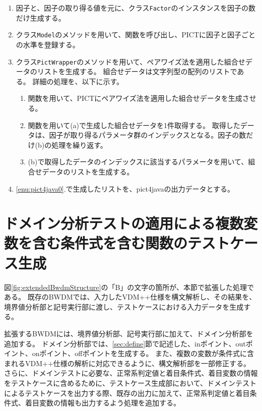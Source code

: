 \documentclass[uplatex, report, a4j, 10pt]{jsbook}
\newcommand\ttt[1]{\texttt{#1}}
\begin{document}
\begin{enumerate}
  \item 因子と、因子の取り得る値を元に、クラス\ttt{Factor}のインスタンスを因子の数だけ生成する。
  \item クラス\ttt{Model}の\addFactor{}メソッドを用いて、\PictAddParameter{}関数を呼び出し、PICTに因子と因子ごとの水準を登録する。
  \item\label{enu:pict4java0} クラス\ttt{PictWrapper}の\generate{}メソッドを用いて、ペアワイズ法を適用した組合せデータのリストを生成する。
        組合せデータは文字列型の配列のリストである。
        詳細の処理を、以下に示す。
        \begin{enumerate}
          \item\label{enu:pict4java1} \PictGenerate{}関数を用いて、PICTにペアワイズ法を適用した組合せデータを生成させる。
          \item\label{enu:pict4java2} \PictGetNextResultRow{}関数を用いて(a)で生成した組合せデータを1件取得する。
                取得したデータは、因子が取り得るパラメータ群のインデックスとなる。因子の数だけ(b)の処理を繰り返す。
          \item (b)で取得したデータのインデックスに該当するパラメータを用いて、組合せデータのリストを生成する。
        \end{enumerate}
  \item \ref{enu:pict4java0}.で生成したリストを、pict4javaの出力データとする。
\end{enumerate}

\section{ドメイン分析テストの適用による複数変数を含む条件式を含む関数のテストケース生成}\label{sec:extendDomain}

図\ref{fig:extendedBwdmStructure}の「B」の文字の箇所が、本節で拡張した処理である。
既存のBWDMでは、入力したVDM++仕様を構文解析し、その結果を、境界値分析部と記号実行部に渡し、テストケースにおける入力データを生成する。

拡張するBWDMには、境界値分析部、記号実行部に加えて、ドメイン分析部を追加する。
ドメイン分析部では、\ref{sec:define}節で記述した、inポイント、outポイント、onポイント、offポイントを生成する。
また、複数の変数が条件式に含まれるVDM++仕様の解析に対応できるように、構文解析部を一部修正する。
さらに、ドメインテストに必要な、正常系判定値と着目条件式、着目変数の情報をテストケースに含めるために、テストケース生成部において、ドメインテストによるテストケースを出力する際、既存の出力に加えて、正常系判定値と着目条件式、着目変数の情報も出力するよう処理を追加する。
\end{document}
